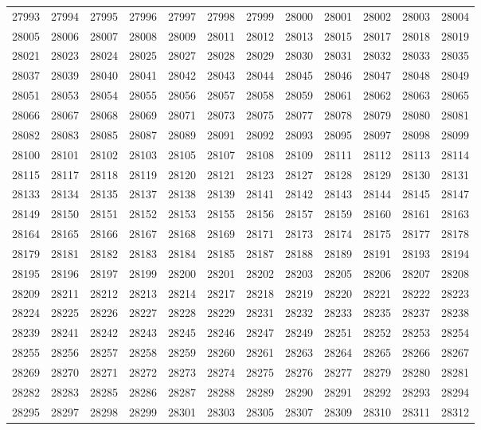 \begin{center}
\begin{longtable}{llllllllllll}
27993 &27994 &27995 &27996 &27997 &27998 &27999 &28000 &28001 &28002 &28003 &28004 \\
28005 &28006 &28007 &28008 &28009 &28011 &28012 &28013 &28015 &28017 &28018 &28019 \\
28021 &28023 &28024 &28025 &28027 &28028 &28029 &28030 &28031 &28032 &28033 &28035 \\
28037 &28039 &28040 &28041 &28042 &28043 &28044 &28045 &28046 &28047 &28048 &28049 \\
28051 &28053 &28054 &28055 &28056 &28057 &28058 &28059 &28061 &28062 &28063 &28065 \\
28066 &28067 &28068 &28069 &28071 &28073 &28075 &28077 &28078 &28079 &28080 &28081 \\
28082 &28083 &28085 &28087 &28089 &28091 &28092 &28093 &28095 &28097 &28098 &28099 \\
28100 &28101 &28102 &28103 &28105 &28107 &28108 &28109 &28111 &28112 &28113 &28114 \\
28115 &28117 &28118 &28119 &28120 &28121 &28123 &28127 &28128 &28129 &28130 &28131 \\
28133 &28134 &28135 &28137 &28138 &28139 &28141 &28142 &28143 &28144 &28145 &28147 \\
28149 &28150 &28151 &28152 &28153 &28155 &28156 &28157 &28159 &28160 &28161 &28163 \\
28164 &28165 &28166 &28167 &28168 &28169 &28171 &28173 &28174 &28175 &28177 &28178 \\
28179 &28181 &28182 &28183 &28184 &28185 &28187 &28188 &28189 &28191 &28193 &28194 \\
28195 &28196 &28197 &28199 &28200 &28201 &28202 &28203 &28205 &28206 &28207 &28208 \\
28209 &28211 &28212 &28213 &28214 &28217 &28218 &28219 &28220 &28221 &28222 &28223 \\
28224 &28225 &28226 &28227 &28228 &28229 &28231 &28232 &28233 &28235 &28237 &28238 \\
28239 &28241 &28242 &28243 &28245 &28246 &28247 &28249 &28251 &28252 &28253 &28254 \\
28255 &28256 &28257 &28258 &28259 &28260 &28261 &28263 &28264 &28265 &28266 &28267 \\
28269 &28270 &28271 &28272 &28273 &28274 &28275 &28276 &28277 &28279 &28280 &28281 \\
28282 &28283 &28285 &28286 &28287 &28288 &28289 &28290 &28291 &28292 &28293 &28294 \\
28295 &28297 &28298 &28299 &28301 &28303 &28305 &28307 &28309 &28310 &28311 &28312 \\

\end{longtable}
\end{center}
